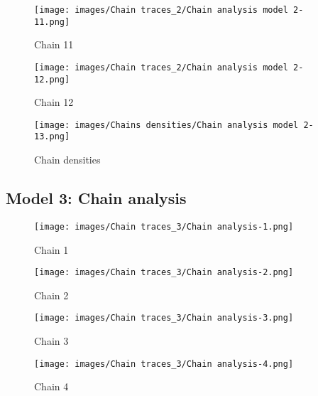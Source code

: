 \documentclass[12pt]{article}
\begin{document}
\begin{figure}[!htb]
   \begin{minipage}{0.48\textwidth}
     \centering
     \texttt{[image: images/Chain traces\_2/Chain analysis model 2-11.png]}
     \caption{Chain 11}\label{Fig:Chain 11}
   \end{minipage}\hfill
   \begin{minipage}{0.48\textwidth}
     \centering
     \texttt{[image: images/Chain traces\_2/Chain analysis model 2-12.png]}
     \caption{Chain 12}\label{Fig: Chain 12}
   \end{minipage}
\end{figure}


 \begin{figure}[h]
    \centering
    \texttt{[image: images/Chains densities/Chain analysis model 2-13.png]}
    \caption{Chain densities}
    \label{fig:Model 2: Chain densities}
\end{figure}

\clearpage
\subsection{Model 3: Chain analysis}

\begin{figure}[!htb]
   \begin{minipage}{0.48\textwidth}
     \centering
     \texttt{[image: images/Chain traces\_3/Chain analysis-1.png]}
     \caption{Chain 1}\label{Fig:Chain 1}
   \end{minipage}\hfill
   \begin{minipage}{0.48\textwidth}
     \centering
     \texttt{[image: images/Chain traces\_3/Chain analysis-2.png]}
     \caption{Chain 2}\label{Fig: Chain 2}
   \end{minipage}
\end{figure}

\begin{figure}[!htb]
   \begin{minipage}{0.48\textwidth}
     \centering
     \texttt{[image: images/Chain traces\_3/Chain analysis-3.png]}
     \caption{Chain 3}\label{Fig:Chain 3}
   \end{minipage}\hfill
   \begin{minipage}{0.48\textwidth}
     \centering
     \texttt{[image: images/Chain traces\_3/Chain analysis-4.png]}
     \caption{Chain 4}\label{Fig: Chain 4}
   \end{minipage}
\end{figure}
\end{document}

